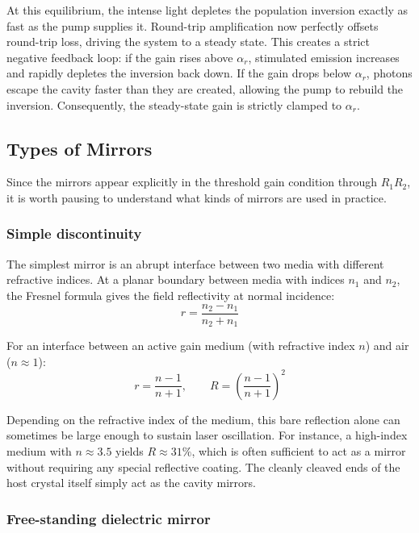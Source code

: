 At this equilibrium, the intense light depletes the population inversion exactly as fast as the pump supplies it. Round-trip amplification now perfectly offsets round-trip loss, driving the system to a steady state. This creates a strict negative feedback loop: if the gain rises above $\alpha_r$, stimulated emission increases and rapidly depletes the inversion back down. If the gain drops below $\alpha_r$, photons escape the cavity faster than they are created, allowing the pump to rebuild the inversion. Consequently, the steady-state gain is strictly clamped to $\alpha_r$.

\subsection{Types of Mirrors}

Since the mirrors appear explicitly in the threshold gain condition through $R_1 R_2$, it is worth pausing to understand what kinds of mirrors are used in practice.

\subsubsection{Simple discontinuity}

The simplest mirror is an abrupt interface between two media with different refractive indices. At a planar boundary between media with indices $n_1$ and $n_2$, the Fresnel formula gives the field reflectivity at normal incidence:
\begin{equation*}
    r = \frac{n_2 - n_1}{n_2 + n_1}
\end{equation*}

For an interface between an active gain medium (with refractive index $n$) and air ($n \approx 1$):
\begin{equation*}
    r = \frac{n - 1}{n + 1}, \qquad R = \left(\frac{n-1}{n+1}\right)^{\!2}
\end{equation*}

Depending on the refractive index of the medium, this bare reflection alone can sometimes be large enough to sustain laser oscillation. For instance, a high-index medium with $n \approx 3.5$ yields $R \approx 31\%$, which is often sufficient to act as a mirror without requiring any special reflective coating. The cleanly cleaved ends of the host crystal itself simply act as the cavity mirrors.

\subsubsection{Free-standing dielectric mirror}

